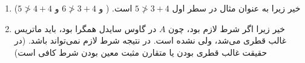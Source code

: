 {\begin{enumerate}
\begin{align*}
\begin{pmatrix}
        0 & \frac{3}{5} & \frac{4}{5} \\
        \frac{1}{2} & 0 & \frac{2}{3} \\
        \frac{4}{5} & \frac{4}{5} & 0
    \end{pmatrix} \xrightarrow{\text{مقادیر ویژه}}  (1.39054, -0.847394, -0.543141)
\end{align*}
ماکسیمم قدرمطلق‌شان 
$1.39054$
است که 
$1 < $
است. در نتیجه واگرا می‌شود.
\\
اما برای گاوس سایدل
$(L + D)^{-1} U$
را حساب می‌کنیم:
\begin{align*}
    \begin{pmatrix}
        0 & \frac{3}{5} & \frac{4}{5} \\
        0 & -\frac{3}{10} & \frac{4}{15} \\
        0 & -\frac{6}{25} & -\frac{64}{75}
    \end{pmatrix} \xrightarrow{\text{مقادیر ویژه}} (0,
    -0.688669, 
    -0.464665)
\end{align*}
که ماکسیمم قدرمطلق‌شان 
$1 > 0.688669$
است. که با همگرا بودن گاوس سایدل سازگار است.
\\
پس گاوس سایدل همگرا و ژاکوبی واگراست.
\item 
خیر زیرا به عنوان مثال در سطر اول
$5 \ngtr 3 + 4$
است.
(
و
$6 \ngtr 3 + 4$
و
$5 \ngtr 4 + 4$)
\item 
خیر زیرا اگر شرط لازم بود، چون 
$A$
در گاوس سایدل همگرا بود، باید ماتریس غالب قطری می‌شد، ولی نشده است. در نتیجه شرط لازم نمی‌تواند باشد. (در حقیقت غالب قطری بودن یا متقارن مثبت معین بودن شرط کافی است)
\end{enumerate}
}